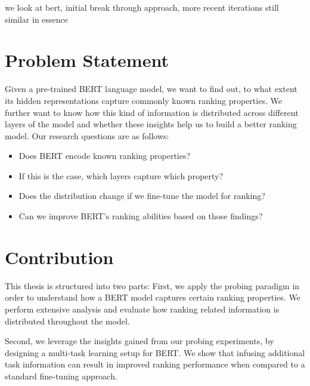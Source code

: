 we look at bert, initial break through approach, more recent iterations still similar in essence

\section{Problem Statement}
Given a pre-trained BERT language model, we want to find out, to what extent its hidden representations capture commonly known ranking properties. We further want to know how this kind of information is distributed across different layers of the model and whether these insights help us to build a better ranking model. Our research questions are as follows:
\begin{itemize}
    \item Does BERT encode known ranking properties?
    \item If this is the case, which layers capture which property?
    \item Does the distribution change if we fine-tune the model for ranking?
    \item Can we improve BERT's ranking abilities based on those findings?
\end{itemize}

\section{Contribution}
This thesis is structured into two parts: First, we apply the probing paradigm in order to understand how a BERT model captures certain ranking properties. We perform extensive analysis and evaluate how ranking related information is distributed throughout the model.

Second, we leverage the insights gained from our probing experiments, by designing a multi-task learning setup for BERT. We show that infusing additional task information can result in improved ranking performance when compared to a standard fine-tuning approach.

